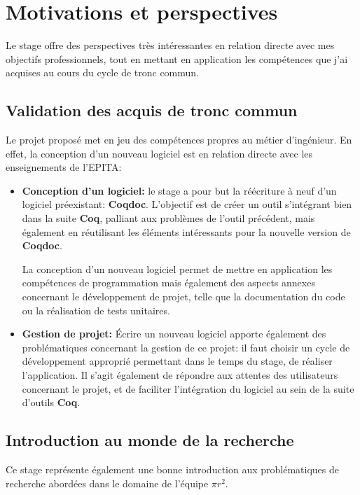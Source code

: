 \documentclass[a4paper, 11pt]{report}
\newcommand{\pir}[0]{\textbf{$\pi r^2$}\xspace}
\newcommand{\coq}[0]{\textbf{Coq}\xspace}
\newcommand{\coqdoc}[0]{\textbf{Coqdoc}\xspace}
\newcommand{\epita}[0]{EPITA}
\begin{document}
  \section{Motivations et perspectives}
  Le stage offre des perspectives très intéressantes en relation directe
  avec mes objectifs professionnels, tout en mettant en application les
  compétences que j'ai acquises au cours du cycle de tronc commun.

  \subsection{Validation des acquis de tronc commun}
  Le projet proposé met en jeu des compétences propres au métier d'ingénieur.
  En effet, la conception d'un nouveau logiciel est en relation directe
  avec les enseignements de l'\epita:
  \begin{itemize}
    \item \textbf{Conception d'un logiciel:} le stage a pour but la réécriture à
      neuf d'un logiciel préexistant: \coqdoc. L'objectif est de créer un outil
      s'intégrant bien dans la suite \coq, palliant aux problèmes de l'outil
      précédent, mais également en réutilisant les éléments intéressants pour
      la nouvelle version de \coqdoc.

      La conception d'un nouveau logiciel permet de mettre en application
      les compétences de programmation mais également des aspects
      annexes concernant le développement de projet, telle que
      la documentation du code ou la réalisation de tests unitaires.
    \item \textbf{Gestion de projet:} Écrire un nouveau logiciel
      apporte également des problématiques concernant la gestion de
      ce projet: il faut choisir un cycle de développement
      approprié permettant dans le temps du stage, de réaliser
      l'application. Il s'agit également de répondre aux attentes
      des utilisateurs concernant le projet, et de faciliter l'intégration
      du logiciel au sein de la suite d'outils \coq.
  \end{itemize}

  \subsection{Introduction au monde de la recherche}
  Ce stage représente également une bonne introduction aux problématiques
  de recherche abordées dans le domaine de l'équipe \pir.
\end{document}
